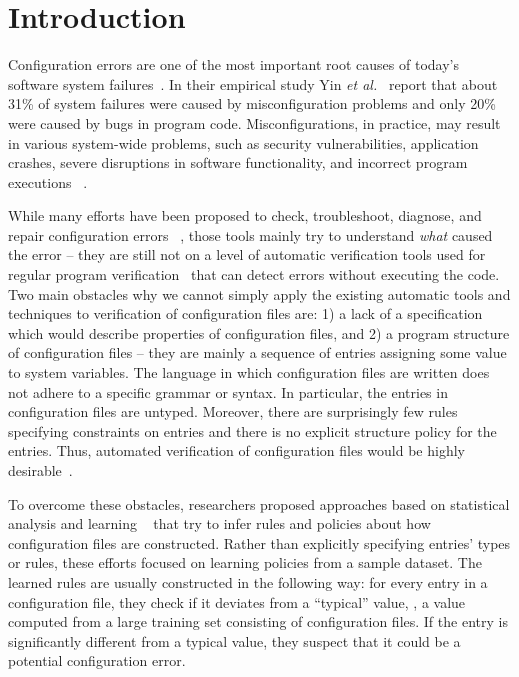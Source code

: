 \section{Introduction}
\label{sec-intro}

Configuration errors are one of the most important root causes of
today's software system failures~\cite{xu15systems, yin11anempirical}.
In their empirical study Yin {\em et al.}~\cite{yin11anempirical} report
that about 31\% of system failures were caused by misconfiguration problems and only 20\% were caused by bugs in program code. 
Misconfigurations, in practice, may result in various
system-wide problems, such as security vulnerabilities, 
application crashes, severe disruptions in software
functionality, and incorrect program executions%
~\cite{zhang14encore, yuan11context, xu13do, xu15hey}.  

While many efforts have been proposed 
to check, troubleshoot, diagnose, and repair configuration errors%
~\cite{attariyan10automating,
su07autobash, whitaker04configuration},
those tools mainly try to understand {\emph{what}} caused the 
error -- they are still not on a level of
automatic verification tools used for regular program 
verification~\cite{Leino10Dafny, PiskacWZ14, BobotFMP15} that can
detect errors without executing the code.
Two main obstacles why we cannot simply apply the existing automatic 
tools and techniques to verification of configuration files are: 1) a lack
of a specification which would describe properties of configuration files, and 2) a program structure of configuration files -- they
are mainly a sequence of entries assigning some value to system variables. The language in which configuration files are written does 
not adhere to a specific grammar or syntax. In particular, the
entries in configuration files are untyped. Moreover, there are surprisingly few rules specifying constraints on entries and there
is no explicit structure policy for the entries.
Thus, automated verification of configuration 
files would be highly
desirable~\cite{wang04automatic, zhang14encore, xu15systems}.

To overcome these obstacles, researchers proposed approaches based on
statistical analysis and learning%
~\cite{wang04automatic, zhang14encore, yuan11context}
that try to infer rules and policies about 
how configuration files are constructed.
Rather than explicitly specifying entries' types or rules, 
these efforts focused on learning policies from a sample dataset.
The learned rules are usually constructed in the following way: 
for every entry in a configuration file, 
they check if it deviates from a ``typical'' value, \ie, 
a value computed from a large training set 
consisting of configuration files.
If the entry is significantly different from a typical value, 
they suspect that it could be a potential configuration error.

